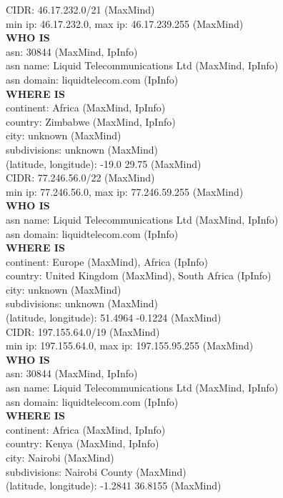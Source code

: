\documentclass[twocolumn]{article}
\begin{document}
CIDR: 46.17.232.0/21 (MaxMind)\\
min ip: 46.17.232.0, max ip: 46.17.239.255 (MaxMind)\\
\textbf{WHO IS}\\
asn: 30844 (MaxMind, IpInfo)\\
asn name: Liquid Telecommunications Ltd (MaxMind, IpInfo)\\
asn domain: liquidtelecom.com (IpInfo)\\
\textbf{WHERE IS}\\
continent: Africa (MaxMind, IpInfo)\\
country: Zimbabwe (MaxMind, IpInfo)\\
city: unknown (MaxMind)\\
subdivisions: unknown (MaxMind)\\
(latitude, longitude): -19.0 29.75 (MaxMind)\\

CIDR: 77.246.56.0/22 (MaxMind)\\
min ip: 77.246.56.0, max ip: 77.246.59.255 (MaxMind)\\
\textbf{WHO IS}\\
asn name: Liquid Telecommunications Ltd (MaxMind, IpInfo)\\
asn domain: liquidtelecom.com (IpInfo)\\
\textbf{WHERE IS}\\
continent: Europe (MaxMind), Africa (IpInfo)\\
country: United Kingdom (MaxMind), South Africa (IpInfo)\\
city: unknown (MaxMind)\\
subdivisions: unknown (MaxMind)\\
(latitude, longitude): 51.4964 -0.1224 (MaxMind)\\

CIDR: 197.155.64.0/19 (MaxMind)\\
min ip: 197.155.64.0, max ip: 197.155.95.255 (MaxMind)\\
\textbf{WHO IS}\\
asn: 30844 (MaxMind, IpInfo)\\
asn name: Liquid Telecommunications Ltd (MaxMind, IpInfo)\\
asn domain: liquidtelecom.com (IpInfo)\\
\textbf{WHERE IS}\\
continent: Africa (MaxMind, IpInfo)\\
country: Kenya (MaxMind, IpInfo)\\
city: Nairobi (MaxMind)\\
subdivisions: Nairobi County (MaxMind)\\
(latitude, longitude): -1.2841 36.8155 (MaxMind)\\
\end{document}
